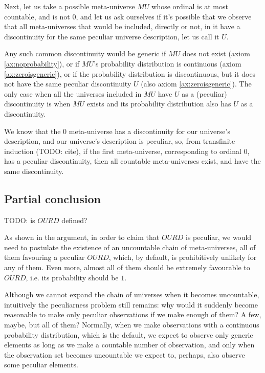 \documentclass[a4paper
]{article}
\def\our_description{OURD}
\begin{document}
Next, let us take a possible meta-universe $MU$ whose ordinal is at most
countable, and is not $0$, and let us
ask ourselves if it's possible that we observe that all meta-universes
that would be included, directly or not, in it have a discontinuity for
the same peculiar universe description, let us call it $U$.

Any such common discontinuity would be generic if $MU$ does not exist
(axiom \ref{ax:noprobability}), or if $MU$'s probability distribution
is continuous (axiom \ref{ax:zeroisgeneric}),
or if the probability distribution is discontinuous,
but it does not have the same peculiar discontinuity $U$
(also axiom \ref{ax:zeroisgeneric}).
The only case when all the universes included in $MU$ have $U$ as a
(peculiar) discontinuity is when $MU$ exists and its probability distribution
also has $U$ as a discontinuity.

We know that the $0$ meta-universe has a discontinuity for
our universe's description, and our universe's description is peculiar, so,
from transfinite induction (TODO: cite), if the first meta-universe,
corresponding to ordinal $0$, has a peculiar discontinuity, then all countable
meta-universes exist, and have the same discontinuity.

\subsection{Partial conclusion}

TODO: is $\our_description$ defined?

As shown in the argument, in order to claim that $\our_description$ is peculiar,
we would need to postulate the
existence of an uncountable chain of meta-universes, all of them favouring a
peculiar $\our_description$, which, by default,
is prohibitively unlikely for any of them. Even more, almost all of them
should be extremely favourable to $\our_description$, i.e. its probability
should be $1$.

Although we cannot expand the chain of universes when it becomes uncountable,
intuitively the peculiarness problem
still remains: why would it suddenly become reasonable to make
only peculiar observations if we make enough of them? A few, maybe, but all
of them? Normally, when we make
observations with a continuous probability distribution, which is the default,
we expect to observe only generic elements as long as we make a
countable number of observation, and only when the observation set
becomes uncountable we expect to, perhaps, also observe some peculiar elements.
\end{document}
